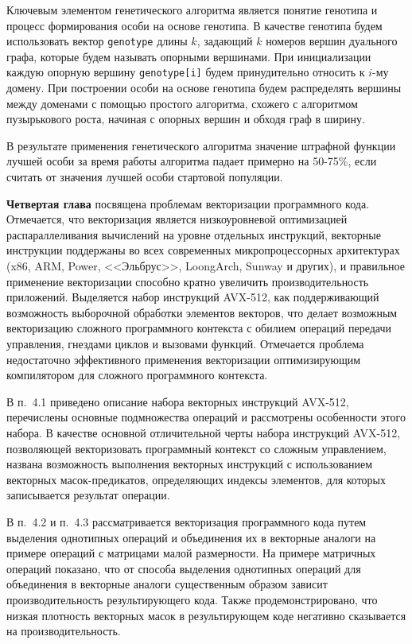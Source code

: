 \documentclass[a4paper,14pt]{extarticle}                     %
\theoremstyle{plain}                                         %
\begin{document}
Ключевым элементом генетического алгоритма является понятие генотипа и процесс формирования особи на основе генотипа.
В качестве генотипа будем использовать вектор \texttt{genotype} длины $k$, задающий $k$ номеров вершин дуального графа, которые будем называть опорными вершинами.
При инициализации каждую опорную вершину \texttt{genotype[i]} будем принудительно относить к $i$-му домену.
При построении особи на основе генотипа будем распределять вершины между доменами с помощью простого алгоритма, схожего с алгоритмом пузырькового роста, начиная с опорных вершин и обходя граф в ширину.

В результате применения генетического алгоритма значение штрафной функции лучшей особи за время работы алгоритма падает примерно на 50-75\%, если считать от значения лучшей особи стартовой популяции.


\textbf{Четвертая глава} посвящена проблемам векторизации программного кода.
Отмечается, что векторизация является низкоуровневой оптимизацией распараллеливания вычислений на уровне отдельных инструкций, векторные инструкции поддержаны во всех современных микропроцессорных архитектурах (x86, ARM, Power, <<Эльбрус>>, LoongArch, Sunway и других), и правильное применение векторизации способно кратно увеличить производительность приложений.
Выделяется набор инструкций AVX-512, как поддерживающий возможность выборочной обработки элементов векторов, что делает возможным векторизацию сложного программного контекста с обилием операций передачи управления, гнездами циклов и вызовами функций.
Отмечается проблема недостаточно эффективного применения векторизации оптимизирующим компилятором для сложного программного контекста.


В п.~4.1 приведено описание набора векторных инструкций AVX-512, перечислены основные подмножества операций и рассмотрены особенности этого набора.
В качестве основной отличительной черты набора инструкций AVX-512, позволяющей векторизовать программный контекст со сложным управлением, названа возможность выполнения векторных инструкций с использованием векторных масок-предикатов, определяющих индексы элементов, для которых записывается результат операции.


В п.~4.2 и п.~4.3 рассматривается векторизация программного кода путем выделения однотипных операций и объединения их в векторные аналоги на примере операций с матрицами малой размерности.
На примере матричных операций показано, что от способа выделения однотипных операций для объединения в векторные аналоги существенным образом зависит производительность результирующего кода.
Также продемонстрировано, что низкая плотность векторных масок в результирующем коде негативно сказывается на производительность.
\end{document}
